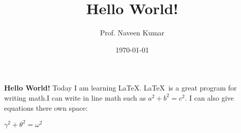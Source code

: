 \documentclass[10pt,a4 paper]{article}
\title{\Large\textbf{Hello World!}}
\author{Prof. Naveen Kumar}
\date{\today}
\begin{document}
\maketitle
\textbf{Hello World!} Today I am learning \LaTeX. \LaTeX\ is a great program for writing math.I can write in line math such as $a^2+b^2=c^2$. I can also give equations there own space:
\begin{center}
$\gamma^2 + \theta^2 = \omega^2$
\end{center}
\end{document}
